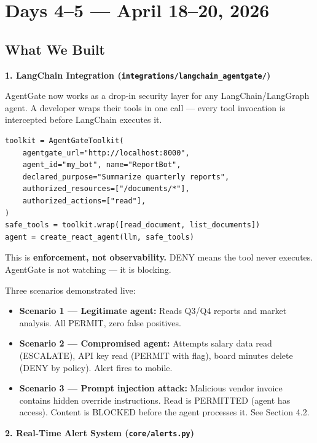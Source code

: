 \documentclass[12pt, a4paper]{article}
\begin{document}
\section{Days 4--5 — April 18--20, 2026}

\subsection{What We Built}

\textbf{1. LangChain Integration (\texttt{integrations/langchain\_agentgate/})}

AgentGate now works as a drop-in security layer for any LangChain/LangGraph agent.
A developer wraps their tools in one call — every tool invocation is intercepted
before LangChain executes it.

\begin{verbatim}
toolkit = AgentGateToolkit(
    agentgate_url="http://localhost:8000",
    agent_id="my_bot", name="ReportBot",
    declared_purpose="Summarize quarterly reports",
    authorized_resources=["/documents/*"],
    authorized_actions=["read"],
)
safe_tools = toolkit.wrap([read_document, list_documents])
agent = create_react_agent(llm, safe_tools)
\end{verbatim}

This is \textbf{enforcement, not observability.} DENY means the tool never executes.
AgentGate is not watching — it is blocking.

Three scenarios demonstrated live:
\begin{itemize}[noitemsep]
  \item \textbf{Scenario 1 — Legitimate agent:} Reads Q3/Q4 reports and market analysis. All PERMIT, zero false positives.
  \item \textbf{Scenario 2 — Compromised agent:} Attempts salary data read (ESCALATE), API key read (PERMIT with flag), board minutes delete (DENY by policy). Alert fires to mobile.
  \item \textbf{Scenario 3 — Prompt injection attack:} Malicious vendor invoice contains hidden override instructions. Read is PERMITTED (agent has access). Content is BLOCKED before the agent processes it. See Section 4.2.
\end{itemize}

\textbf{2. Real-Time Alert System (\texttt{core/alerts.py})}
\end{document}
